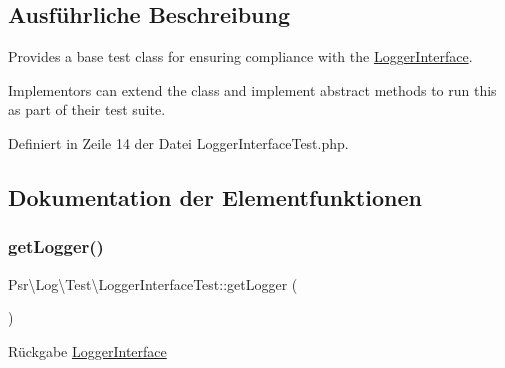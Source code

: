 \subsection{Ausführliche Beschreibung}
Provides a base test class for ensuring compliance with the \mbox{\hyperlink{interface_psr_1_1_log_1_1_logger_interface}{Logger\+Interface}}.

Implementors can extend the class and implement abstract methods to run this as part of their test suite. 

Definiert in Zeile 14 der Datei Logger\+Interface\+Test.\+php.



\subsection{Dokumentation der Elementfunktionen}
\mbox{\label{class_psr_1_1_log_1_1_test_1_1_logger_interface_test_a844e56daa065e938e3038d55de09929f}} 
\subsubsection{\texorpdfstring{get\+Logger()}{getLogger()}}
{\footnotesize\ttfamily Psr\textbackslash{}\+Log\textbackslash{}\+Test\textbackslash{}\+Logger\+Interface\+Test\+::get\+Logger (\begin{DoxyParamCaption}{ }\end{DoxyParamCaption})\hspace{0.3cm}{\ttfamily [abstract]}}

\begin{DoxyReturn}{Rückgabe}
\mbox{\hyperlink{interface_psr_1_1_log_1_1_logger_interface}{Logger\+Interface}} 
\end{DoxyReturn}
\mbox{\label{class_psr_1_1_log_1_1_test_1_1_logger_interface_test_a3223af022509f614758b28d50fba59d7}} 
